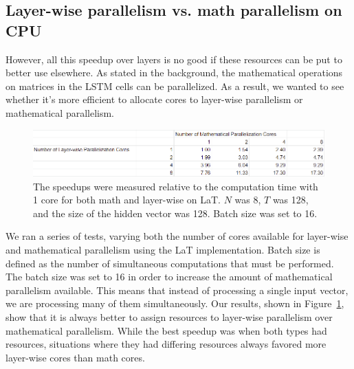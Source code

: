 \documentclass[12pt]{article}
\begin{document}
\subsection{Layer-wise parallelism vs. math parallelism on CPU}
However, all this speedup over layers is no good if these resources can be put to better use elsewhere. As stated in the background, the mathematical operations on matrices in the LSTM cells can be parallelized. As a result, we wanted to see whether it's more efficient to allocate cores to layer-wise parallelism or mathematical parallelism.

\begin{figure}
    \centering
    \includegraphics[width=15cm]{table.png}
    \caption{The speedups were measured relative to the computation time with 1 core for both math and layer-wise on LaT. $N$ was 8, $T$ was 128, and the size of the hidden vector was 128. Batch size was set to 16. }
    \label{fig:layerwise_versus_math_cpu}
\end{figure}

We ran a series of tests, varying both the number of cores available for layer-wise and mathematical parallelism using the LaT implementation.
Batch size is defined as the number of simultaneous computations that must be performed.
The batch size was set to 16 in order to increase the amount of mathematical parallelism available.
This means that instead of processing a single input vector, we are processing many of them simultaneously.
Our results, shown in Figure~\ref{fig:layerwise_versus_math_cpu}, show that it is always better to assign resources to layer-wise parallelism over mathematical parallelism. While the best speedup was when both types had resources, situations where they had differing resources always favored more layer-wise cores than math cores.
\end{document}
